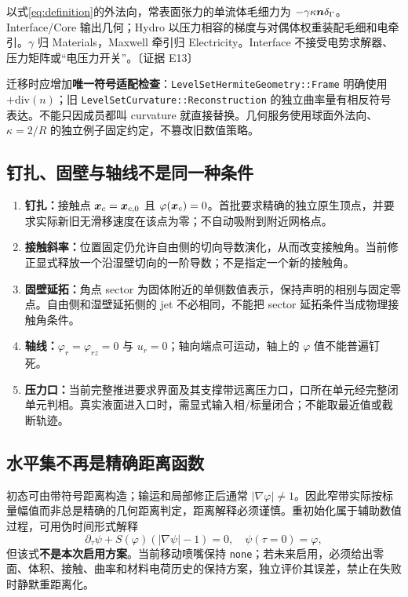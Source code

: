 \documentclass[UTF8,a4paper,11pt,fontset=fandol]{ctexart}
\newcommand{\code}[1]{\nolinkurl{#1}}
\newcommand{\ev}[1]{{\small\color{muted}〔证据 #1〕}}
\newcommand{\ph}{\varphi}\newcommand{\dt}{\Delta t}
\begin{document}
以式\eqref{eq:definition}的外法向，常表面张力的单流体毛细力为 $-\gamma\kappa\bm n\delta_\Gamma$。Interface/Core 输出几何；Hydro 以压力相容的梯度与对偶体权重装配毛细和电牵引。$\gamma$ 归 Materials，Maxwell 牵引归 Electricity。Interface 不接受电势求解器、压力矩阵或“电压力开关”。\ev{E13}

迁移时应增加\textbf{唯一符号适配检查}：\code{LevelSetHermiteGeometry::Frame} 明确使用 $+\mathrm{div}(n)$；旧 \code{LevelSetCurvature::Reconstruction} 的独立曲率量有相反符号表达。不能只因成员都叫 curvature 就直接替换。几何服务使用球面外法向、$\kappa=2/R$ 的独立例子固定约定，不篡改旧数值策略。

\subsection{钉扎、固壁与轴线不是同一种条件}
\begin{enumerate}
\item \textbf{钉扎：}接触点 $\bm x_c=\bm x_{c,0}$ 且 $\ph(\xx_c)=0$。首批要求精确的独立原生顶点，并要求实际新旧无滑移速度在该点为零；不自动吸附到附近网格点。
\item \textbf{接触斜率：}位置固定仍允许自由侧的切向导数演化，从而改变接触角。当前修正显式释放一个沿湿壁切向的一阶导数；不是指定一个新的接触角。
\item \textbf{固壁延拓：}角点 sector 为固体附近的单侧数值表示，保持声明的相别与固定零点。自由侧和湿壁延拓侧的 jet 不必相同，不能把 sector 延拓条件当成物理接触角条件。
\item \textbf{轴线：}$\ph_r=\ph_{rz}=0$ 与 $u_r=0$；轴向端点可运动，轴上的 $\ph$ 值不能普遍钉死。
\item \textbf{压力口：}当前完整推进要求界面及其支撑带远离压力口，口所在单元经完整闭单元判相。真实液面进入口时，需显式输入相/标量闭合；不能取最近值或截断轨迹。
\end{enumerate}

\subsection{水平集不再是精确距离函数}
初态可由带符号距离构造；输运和局部修正后通常 $|\nabla\ph|\ne1$。因此窄带实际按标量幅值而非总是精确的几何距离判定，距离解释必须谨慎。重初始化属于辅助数值过程，可用伪时间形式解释
\[
 \partial_\tau\psi+S(\ph)(|\nabla\psi|-1)=0,
 \quad\psi(\tau=0)=\ph,
\]
但该式\textbf{不是本次启用方案}。当前移动喷嘴保持 \texttt{none}；若未来启用，必须给出零面、体积、接触、曲率和材料电荷历史的保持方案，独立评价其误差，禁止在失败时静默重距离化。
\end{document}
